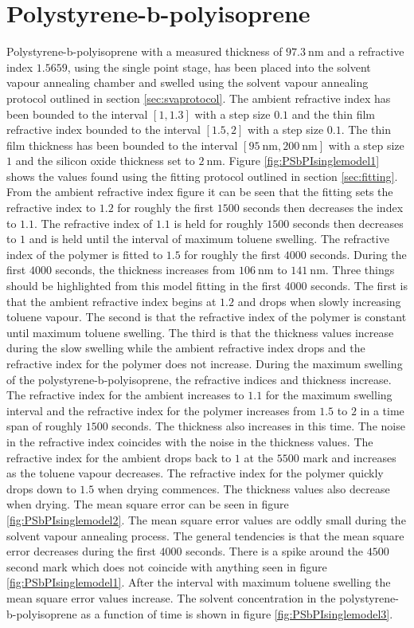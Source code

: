 \documentclass[MasterThesisMain.tex]{subfiles}
\begin{document}
\section{Polystyrene-b-polyisoprene} 
Polystyrene-b-polyisoprene with a measured thickness of $\SI{97.3}{\nano\meter}$ and a refractive index $1.5659$, using the single point stage, has been placed into the solvent vapour annealing chamber and swelled using the solvent vapour annealing protocol outlined in section \ref{sec:svaprotocol}. The ambient refractive index has been bounded to the interval $[1,1.3]$ with a step size $0.1$ and the thin film refractive index bounded to the interval $[1.5,2]$ with a step size $0.1$. The thin film thickness has been bounded to the interval $[\SI{95}{\nano\meter},\SI{200}{\nano\meter}]$ with a step size $1$ and the silicon oxide thickness set to $\SI{2}{\nano\meter}$. Figure \ref{fig:PSbPIsinglemodel1} shows the values found using the fitting protocol outlined in section \ref{sec:fitting}. From the ambient refractive index figure it can be seen that the fitting sets the refractive index to $1.2$ for roughly the first $1500$ seconds then decreases the index to $1.1$. The refractive index of $1.1$ is held for roughly $1500$ seconds then decreases to $1$ and is held until the interval of maximum toluene swelling. The refractive index of the polymer is fitted to $1.5$ for roughly the first $4000$ seconds. During the first $4000$ seconds, the thickness increases from $\SI{106}{\nano\meter}$ to $\SI{141}{\nano\meter}$. Three things should be highlighted from this model fitting in the first $4000$ seconds. The first is that the ambient refractive index begins at $1.2$ and drops when slowly increasing toluene vapour. The second is that the refractive index of the polymer is constant until maximum toluene swelling. The third is that the thickness values increase during the slow swelling while the ambient refractive index drops and the refractive index for the polymer does not increase. During the maximum swelling of the polystyrene-b-polyisoprene, the refractive indices and thickness increase. The refractive index for the ambient increases to $1.1$ for the maximum swelling interval and the refractive index for the polymer increases from $1.5$ to $2$ in a time span of roughly $1500$ seconds. The thickness also increases in this time. The noise in the refractive index coincides with the noise in the thickness values. The refractive index for the ambient drops back to $1$ at the $5500$ mark and increases as the toluene vapour decreases. The refractive index for the polymer quickly drops down to $1.5$ when drying commences. The thickness values also decrease when drying. The mean square error can be seen in figure \ref{fig:PSbPIsinglemodel2}. The mean square error values are oddly small during the solvent vapour annealing process. The general tendencies is that the mean square error decreases during the first $4000$ seconds. There is a spike around the $4500$ second mark which does not coincide with anything seen in figure \ref{fig:PSbPIsinglemodel1}. After the interval with maximum toluene swelling the mean square error values increase. The solvent concentration in the polystyrene-b-polyisoprene as a function of time is shown in figure \ref{fig:PSbPIsinglemodel3}. 
\end{document}

